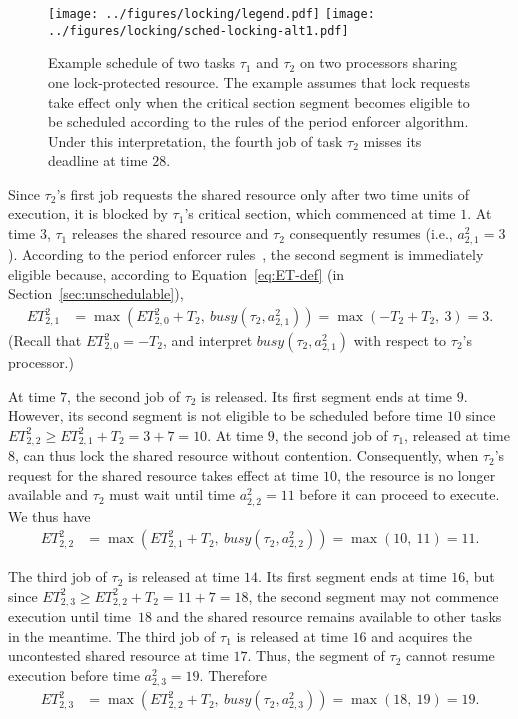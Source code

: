 \begin{figure}[t]
  \centering
  \texttt{[image: ../figures/locking/legend.pdf]}
  \texttt{[image: ../figures/locking/sched-locking-alt1.pdf]}
  \caption{Example schedule of two tasks $\tau_1$ and $\tau_2$ on two processors sharing one lock-protected resource. The example assumes that lock requests take effect only when the critical section segment  becomes eligible to be scheduled according to the rules of the period enforcer algorithm. Under this interpretation, the fourth job of task $\tau_2$ misses its deadline at time $28$.}
  \label{fig:locking-alt1}
\end{figure}


Since $\tau_2$'s first job requests the shared resource only after two time units of execution, it is blocked by $\tau_1$'s critical section, which commenced at time $1$. At time $3$, $\tau_1$ releases the shared resource and $\tau_2$ consequently resumes (i.e., $a^2_{2,1} = 3$). According to the period enforcer rules~\cite{Raj:suspension1991}, the second segment is immediately eligible because, according to Equation~\ref{eq:ET-def} (in Section~\ref{sec:unschedulable}),
\begin{align*}
	ET_{2,1}^2 & = \max\left(ET_{2,0}^2 + T_2,\ \mathit{busy}(\tau_2, a^2_{2,1})\right) =\max(-T_2 + T_2,\ 3) = 3.
\end{align*}
(Recall that $ET_{2,0}^2 = -T_2$, and interpret $\mathit{busy}(\tau_2, a^2_{2,1})$ with respect to $\tau_2$'s processor.)


At time $7$, the second job of $\tau_2$ is released. Its first segment ends at time $9$. However, its second segment is not eligible to be scheduled before time $10$ since $ET_{2,2}^2 \geq ET_{2,1}^2 + T_2 = 3 + 7 = 10$. At time $9$, the second job of $\tau_1$, released at time $8$, can thus lock the shared resource without contention. Consequently, when $\tau_2$'s request for the shared resource takes effect at time $10$, the resource is no longer available and $\tau_2$ must wait until time $a^2_{2,2} = 11$ before it can proceed to execute. We thus have
\begin{align*}
	ET_{2,2}^2 & = \max\left(ET_{2,1}^2 + T_2,\ \mathit{busy}(\tau_2, a^2_{2,2})\right) =\max(10,\ 11) = 11.
\end{align*}

The third job of $\tau_2$ is released at time $14$. Its first segment ends at time $16$, but since $ET_{2,3}^2 \geq ET_{2,2}^2 + T_2 = 11 + 7 = 18$, the second segment may not commence execution until time~$18$ and the shared resource remains available to other tasks in the meantime. The third job of $\tau_1$ is released at time $16$ and acquires the uncontested shared resource at time $17$. Thus, the segment of $\tau_2$ cannot resume execution before time $a^2_{2,3} = 19$. Therefore
\begin{align*}
	ET_{2,3}^2 & = \max\left(ET_{2,2}^2 + T_2,\ \mathit{busy}(\tau_2, a^2_{2,3})\right) =\max(18,\ 19) = 19.
\end{align*}

